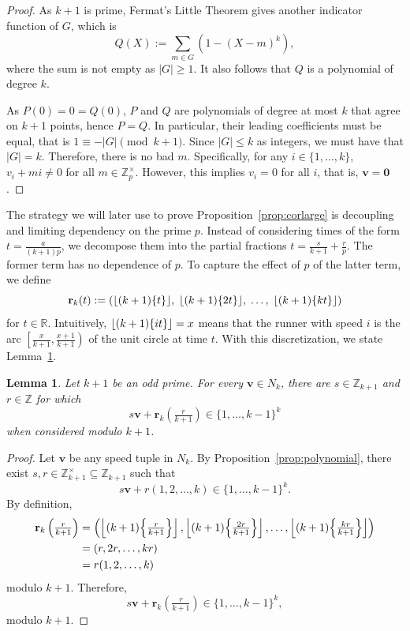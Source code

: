 \documentclass[11pt]{amsart}
\DeclarePairedDelimiter\fracpart{\{}{\}}
\newcommand{\Unit}[1]{\Z_{#1}^\times}
\newcommand{\R}{\mathbb{R}}
\newcommand{\Z}{\mathbb{Z}}
\newcommand{\rbf}{\mathbf{r}}
\newcommand{\vbf}{\mathbf{v}}
\newcommand{\onetok}{(1, 2, \dots, k)}
\newtheorem{lemma}[theorem]{Lemma}
\theoremstyle{definition}
\theoremstyle{remark}
\begin{document}
\begin{proof}
    As $k+1$ is prime, Fermat's Little Theorem gives another indicator function of $G$, which is
    \[ Q(X) := \sum_{m \in G} (1-(X-m)^k), \] 
    where the sum is not empty as $|G| \ge 1$.
    It also follows that $Q$ is a polynomial of degree $k$.
    
    As $P(0) = 0 = Q(0)$, $P$ and $Q$ are polynomials of degree at most $k$ that agree on $k+1$ points, hence $P = Q$.
    In particular, their leading coefficients must be equal, that is 
    $1 \equiv -|G| \pmod{k+1}$. Since $|G| \le k$ as integers, we must have that $|G| = k$.
    Therefore, there is no bad $m$. Specifically, for any $i\in\{1,\ldots,k\}$, $v_i+mi \neq 0$
    for all $m\in\Unit{p}$. 
    However, this implies $v_i = 0$ for all $i$, that is, $\vbf = \mathbf{0}$.
\end{proof}

The strategy we will later use to prove Proposition~\ref{prop:corlarge} is decoupling and limiting dependency on the prime $p$. 
Instead of considering times of the form $t=\frac{a}{(k+1)p}$, we decompose them into the partial fractions $t=\frac{s}{k+1}+\frac{r}{p}$.
The former term has no dependence of $p$. To capture the effect of $p$ of the latter term, we define 
\[ \rbf_k(t):=\left( \lfloor (k+1) \fracpart{t} \rfloor, \; \lfloor (k+1)\fracpart{2t} \rfloor, \; \ldots, \; \lfloor  (k+1) \fracpart{kt} \rfloor \right) \] 
for $t\in\R$.
Intuitively, $\lfloor (k+1) \fracpart{it} \rfloor = x$ means that the runner with speed $i$ is the arc 
$\left[ \frac{x}{k+1}, \frac{x+1}{k+1} \right)$ of the unit circle at time $t$.
With this discretization, we state Lemma~\ref{lem:resolvekplusone}.

\begin{lemma}
\label{lem:resolvekplusone}
    Let $k+1$ be an odd prime. For every $\vbf \in N_k$, there are $s \in \Z_{k+1}$ and $r \in \Z$ for which 
    \[ s\vbf + \rbf_k(\tfrac r{k+1}) \in \{1,\ldots,k-1\}^k\] when considered modulo $k+1$.
\end{lemma}
\begin{proof}
  Let $\vbf$ be any speed tuple in $N_k$.
  By Proposition~\ref{prop:polynomial},
  there exist $s,r\in\Unit{k+1}\subseteq\Z_{k+1}$ such that
  \[s\vbf + r\onetok  \in \{1,\ldots,k-1\}^k.\] 
  By definition, \[\begin{split}
      \rbf_k\left(\tfrac{r}{k+1}\right) 
      &=\left(\left\lfloor (k+1)\fracpart*{\tfrac{r}{k+1}} \right\rfloor,\left\lfloor (k+1)\fracpart*{\tfrac{2r}{k+1}} \right\rfloor,\ldots, 
        \left\lfloor (k+1)\fracpart*{\tfrac{kr}{k+1}}\right\rfloor \right)\\
      &=(r,2r,\ldots,kr)\\&=r\onetok
  \end{split}\]
  modulo $k+1$. Therefore,
  \[s\vbf+\rbf_k \left( \tfrac{r}{k+1} \right) \in \{1,\ldots,k-1\}^k,\]
  modulo $k+1$.
\end{proof}
\end{document}
